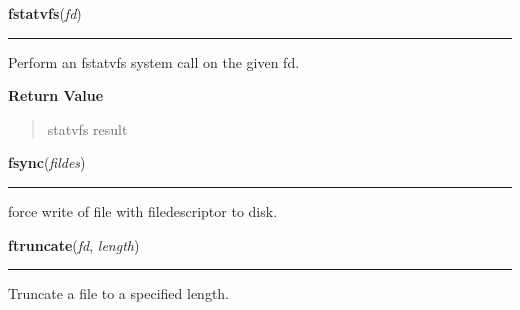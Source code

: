 \hspace{.8\funcindent}\begin{boxedminipage}{\funcwidth}

    \raggedright \textbf{fstatvfs}(\textit{fd})

    \vspace{-1.5ex}

    \rule{\textwidth}{0.5\fboxrule}
\setlength{\parskip}{2ex}
    Perform an fstatvfs system call on the given fd.

\setlength{\parskip}{1ex}
      \textbf{Return Value}
    \vspace{-1ex}

      \begin{quote}
      statvfs result

      \end{quote}

    \end{boxedminipage}

    \label{os:fsync}

    \vspace{0.5ex}

\hspace{.8\funcindent}\begin{boxedminipage}{\funcwidth}

    \raggedright \textbf{fsync}(\textit{fildes})

    \vspace{-1.5ex}

    \rule{\textwidth}{0.5\fboxrule}
\setlength{\parskip}{2ex}
    force write of file with filedescriptor to disk.

\setlength{\parskip}{1ex}
    \end{boxedminipage}

    \label{os:ftruncate}

    \vspace{0.5ex}

\hspace{.8\funcindent}\begin{boxedminipage}{\funcwidth}

    \raggedright \textbf{ftruncate}(\textit{fd}, \textit{length})

    \vspace{-1.5ex}

    \rule{\textwidth}{0.5\fboxrule}
\setlength{\parskip}{2ex}
    Truncate a file to a specified length.

\setlength{\parskip}{1ex}
    \end{boxedminipage}

